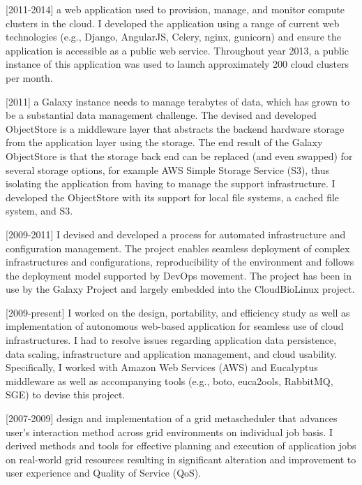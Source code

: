 \documentclass{article}
\begin{document}
[2011-2014]
a web application used to provision, manage, and monitor compute clusters in the cloud. I developed the application using a range of current web technologies (e.g., Django, AngularJS, Celery, nginx, gunicorn) and ensure the application is accessible as a public web service. Throughout year 2013, a public instance of this application was used to launch approximately 200 cloud clusters per month.

[2011]
a Galaxy instance needs to manage terabytes of data, which has grown to be a substantial data management challenge. The devised and developed ObjectStore is a middleware layer that abstracts the backend hardware storage from the application layer using the storage. The end result of the Galaxy ObjectStore is that the storage back end can be replaced (and even swapped) for several storage options, for example AWS Simple Storage Service (S3), thus isolating the application from having to manage the support infrastructure. I developed the ObjectStore with its support for local file systems, a cached file system, and S3.

[2009-2011]
I devised and developed a process for automated infrastructure and configuration management. The project enables seamless deployment of complex infrastructures and configurations, reproducibility of the environment and follows the deployment model supported by DevOps movement. The project has been in use by the Galaxy Project and largely embedded into the CloudBioLinux project.

[2009-present]
I worked on the design, portability, and efficiency study as well as implementation of autonomous web-based application for seamless use of cloud infrastructures. I had to resolve issues regarding application data persistence, data scaling, infrastructure and application management, and cloud usability. Specifically, I worked with Amazon Web Services (AWS) and Eucalyptus middleware as well as accompanying tools (e.g., boto, euca2ools, RabbitMQ, SGE) to devise this project.

[2007-2009]
design and implementation of a grid metascheduler that advances user’s interaction method across grid environments on individual job basis. I derived methods and tools for effective planning and execution of application jobs on real-world grid resources resulting in significant alteration and improvement to user experience and Quality of Service (QoS).
\end{document}

